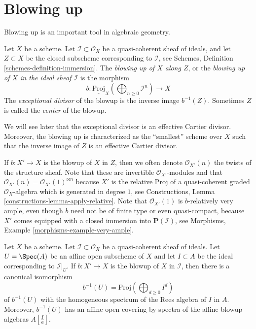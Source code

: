 \section{Blowing up}
\label{section-blowing-up}

\noindent
Blowing up is an important tool in algebraic geometry.

\begin{definition}
\label{definition-blow-up}
Let $X$ be a scheme. Let $\mathcal{I} \subset \mathcal{O}_X$ be a
quasi-coherent sheaf of ideals, and let $Z \subset X$ be the closed subscheme
corresponding to $\mathcal{I}$, see
Schemes, Definition \ref{schemes-definition-immersion}.
The {\it blowing up of $X$ along $Z$}, or the
{\it blowing up of $X$ in the ideal sheaf $\mathcal{I}$} is
the morphism
$$
b :
\underline{\text{Proj}}_X
\left(\bigoplus\nolimits_{n \geq 0} \mathcal{I}^n\right)
\longrightarrow
X
$$
The {\it exceptional divisor} of the blowup is the inverse image
$b^{-1}(Z)$. Sometimes $Z$ is called the {\it center} of the blowup.
\end{definition}

\noindent
We will see later that the exceptional divisor is an effective Cartier
divisor. Moreover, the blowing up is characterized as the ``smallest'' scheme
over $X$ such that the inverse image of $Z$ is an effective Cartier divisor.

\medskip\noindent
If $b : X' \to X$ is the blowup of $X$ in $Z$, then we often denote
$\mathcal{O}_{X'}(n)$ the twists of the structure sheaf. Note that these
are invertible $\mathcal{O}_{X'}$-modules and that
$\mathcal{O}_{X'}(n) = \mathcal{O}_{X'}(1)^{\otimes n}$
because $X'$ is the relative Proj of a quasi-coherent graded
$\mathcal{O}_X$-algebra which is generated in degree $1$, see
Constructions, Lemma \ref{constructions-lemma-apply-relative}.
Note that $\mathcal{O}_{X'}(1)$ is $b$-relatively very ample, even though
$b$ need not be of finite type or even quasi-compact, because
$X'$ comes equipped with a closed immersion into $\mathbf{P}(\mathcal{I})$,
see Morphisms, Example \ref{morphisms-example-very-ample}.

\begin{lemma}
\label{lemma-blowing-up-affine}
Let $X$ be a scheme. Let $\mathcal{I} \subset \mathcal{O}_X$ be a
quasi-coherent sheaf of ideals. Let $U = \Spec(A)$ be an affine open
subscheme of $X$ and let $I \subset A$ be the ideal corresponding to
$\mathcal{I}|_U$. If $b : X' \to X$ is the blowup of $X$ in $\mathcal{I}$,
then there is a canonical isomorphism
$$
b^{-1}(U) = \text{Proj}(\bigoplus\nolimits_{d \geq 0} I^d)
$$
of $b^{-1}(U)$ with the homogeneous spectrum of the Rees algebra
of $I$ in $A$. Moreover, $b^{-1}(U)$ has an affine open covering by
spectra of the affine blowup algebras $A[\frac{I}{a}]$.
\end{lemma}

